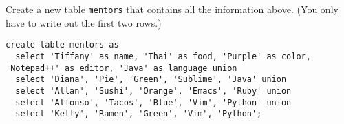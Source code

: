 \question Create a new table \lstinline$mentors$ that contains all the information above.
(You only have to write out the first two rows.)

\begin{solution}[1in]
\begin{lstlisting}
create table mentors as
  select 'Tiffany' as name, 'Thai' as food, 'Purple' as color, 'Notepad++' as editor, 'Java' as language union
  select 'Diana', 'Pie', 'Green', 'Sublime', 'Java' union
  select 'Allan', 'Sushi', 'Orange', 'Emacs', 'Ruby' union
  select 'Alfonso', 'Tacos', 'Blue', 'Vim', 'Python' union
  select 'Kelly', 'Ramen', 'Green', 'Vim', 'Python';
\end{lstlisting}
\end{solution}
